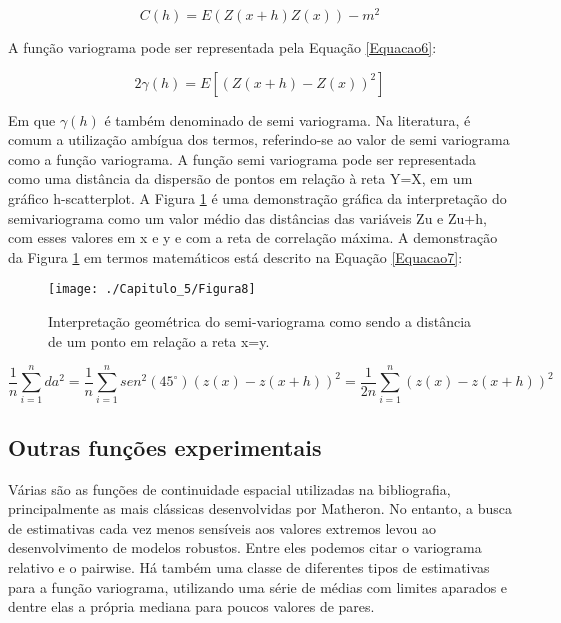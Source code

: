 \begin{equation}\label{Equacao5}
C(h) = E\left( Z(x+h)Z(x)\right)  -m^2
\end{equation}

A função variograma pode ser representada pela Equação \ref{Equacao6}:

\begin{equation}\label{Equacao6}
2\gamma(h) = E\left[ \left( Z(x+h)-Z(x)\right)^2\right] 
\end{equation}

Em que $\gamma(h)$ é também denominado de semi variograma. Na literatura, é comum a utilização ambígua dos termos, referindo-se ao valor de semi variograma como a função variograma. A função semi variograma pode ser representada como uma distância da dispersão de pontos em relação à reta Y=X, em um gráfico h-scatterplot.  A Figura \ref{Figura8} é uma demonstração gráfica da interpretação do semivariograma como um valor médio das distâncias das variáveis Zu e Zu+h, com esses valores em x e y e com a reta de correlação máxima. A demonstração da Figura \ref{Figura8} em termos matemáticos está descrito na Equação \ref{Equacao7}:

\begin{figure}[H]
	\centering
	\texttt{[image: ./Capitulo\_5/Figura8]}
	\caption{Interpretação geométrica do semi-variograma como sendo a distância de um ponto em relação a reta x=y.}
	\label{Figura8}
\end{figure}

\begin{equation}\label{Equacao7}
\frac{1}{n} \sum_{i=1}^{n} da^2 =\frac{1}{n} \sum_{i=1}^{n} sen^2(45^\circ)\left( z(x) -z(x+h) \right)^2 = \frac{1}{2n} \sum_{i=1}^{n} \left( z(x) -z(x+h) \right)^2
\end{equation}

\subsection{Outras funções experimentais}

Várias são as funções de continuidade espacial utilizadas na bibliografia, principalmente as mais clássicas desenvolvidas por Matheron. No entanto, a busca de estimativas cada vez menos sensíveis aos valores extremos levou ao desenvolvimento de modelos robustos. Entre eles podemos citar o variograma relativo e o pairwise. Há também uma classe de diferentes tipos de estimativas para a função variograma, utilizando uma série de médias com limites aparados e dentre elas a própria mediana para poucos valores de pares. 

